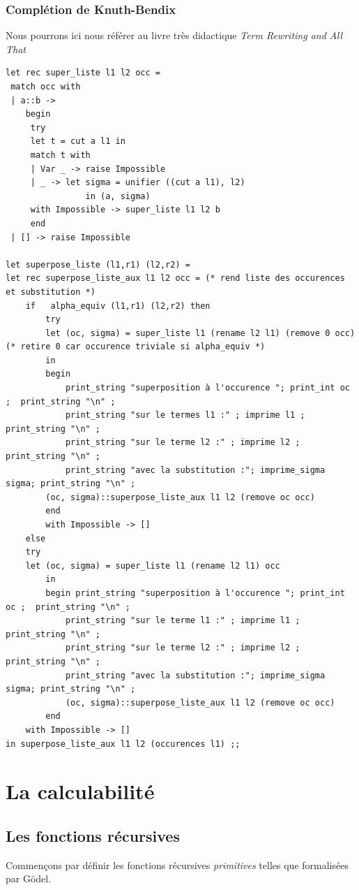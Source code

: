 \documentclass[11pt]{book}
\begin{document}
\subsection{Complétion de Knuth-Bendix}
Nous pourrons ici nous référer au livre très didactique \textit{Term Rewriting and All That}\cite{rewriting}
\begin{Verbatim}
let rec super_liste l1 l2 occ =
 match occ with
 | a::b -> 
	begin
	 try 
	 let t = cut a l1 in
	 match t with 
	 | Var _ -> raise Impossible
	 | _ -> let sigma = unifier ((cut a l1), l2)
 				in (a, sigma)
	 with Impossible -> super_liste l1 l2 b 
	 end
 | [] -> raise Impossible
  
let superpose_liste (l1,r1) (l2,r2) =
let rec superpose_liste_aux l1 l2 occ = (* rend liste des occurences et substitution *)
	if   alpha_equiv (l1,r1) (l2,r2) then 
		try
		let (oc, sigma) = super_liste l1 (rename l2 l1) (remove 0 occ) (* retire 0 car occurence triviale si alpha_equiv *)
		in 
		begin
			print_string "superposition à l'occurence "; print_int oc ;  print_string "\n" ;
			print_string "sur le termes l1 :" ; imprime l1 ; print_string "\n" ;
			print_string "sur le terme l2 :" ; imprime l2 ; print_string "\n" ;
			print_string "avec la substitution :"; imprime_sigma sigma; print_string "\n" ;
		(oc, sigma)::superpose_liste_aux l1 l2 (remove oc occ)
		end
		with Impossible -> []
	else 
	try
	let (oc, sigma) = super_liste l1 (rename l2 l1) occ
		in 
		begin print_string "superposition à l'occurence "; print_int oc ;  print_string "\n" ;
			print_string "sur le terme l1 :" ; imprime l1 ; print_string "\n" ;
			print_string "sur le terme l2 :" ; imprime l2 ; print_string "\n" ;
			print_string "avec la substitution :"; imprime_sigma sigma; print_string "\n" ;
			(oc, sigma)::superpose_liste_aux l1 l2 (remove oc occ)
		end
	with Impossible -> []
in superpose_liste_aux l1 l2 (occurences l1) ;;
\end{Verbatim}

\chapter{La calculabilité}

\section{Les fonctions récursives}
Commençons  par définir les fonctions récursives \textit{primitives} telles que formalisées par
Gödel.
\end{document}
